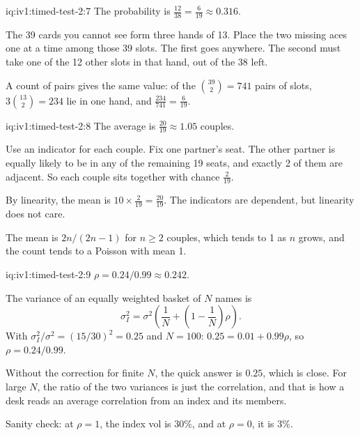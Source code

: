 \begin{solution}{iq:iv1:timed-test-2:7}
The probability is $\frac{12}{38} = \frac{6}{19} \approx 0.316$.

The 39 cards you cannot see form three hands of 13. Place the two missing aces one at a time among those 39 slots. The first goes anywhere. The second must take one of the 12 other slots in that hand, out of the 38 left.

A count of pairs gives the same value: of the $\binom{39}{2} = 741$ pairs of slots, $3\binom{13}{2} = 234$ lie in one hand, and $\frac{234}{741} = \frac{6}{19}$.

\end{solution}

\begin{solution}{iq:iv1:timed-test-2:8}
The average is $\frac{20}{19} \approx 1.05$ couples.

Use an indicator for each couple. Fix one partner's seat. The other partner is equally likely to be in any of the remaining 19 seats, and exactly 2 of them are adjacent. So each couple sits together with chance $\frac{2}{19}$.

By linearity, the mean is $10 \times \frac{2}{19} = \frac{20}{19}$. The indicators are dependent, but linearity does not care.

The mean is $2n/(2n - 1)$ for $n \ge 2$ couples, which tends to 1 as $n$ grows, and the count tends to a Poisson with mean 1.

\end{solution}

\begin{solution}{iq:iv1:timed-test-2:9}
$\rho = 0.24/0.99 \approx 0.242$.

The variance of an equally weighted basket of $N$ names is
\[
\sigma_I^2 = \sigma^2\left(\frac1N + \left(1 - \frac1N\right)\rho\right).
\]
With $\sigma_I^2/\sigma^2 = (15/30)^2 = 0.25$ and $N = 100$: $0.25 = 0.01 + 0.99\rho$, so $\rho = 0.24/0.99$.

Without the correction for finite $N$, the quick answer is $0.25$, which is close. For large $N$, the ratio of the two variances is just the correlation, and that is how a desk reads an average correlation from an index and its members.

Sanity check: at $\rho = 1$, the index vol is 30\%, and at $\rho = 0$, it is 3\%.

\end{solution}

